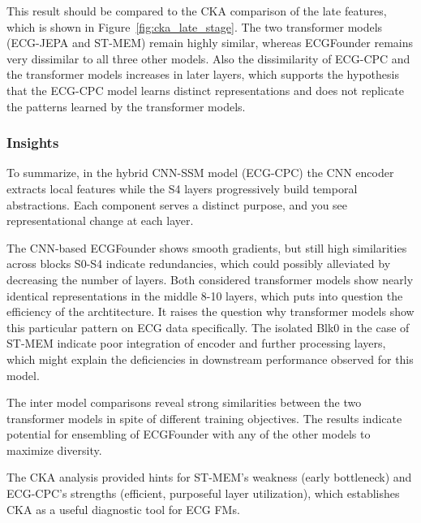 \documentclass{article}
\begin{document}
            This result should be compared to the CKA comparison of the late features, which is shown in Figure~\ref{fig:cka_late_stage}. The two transformer models (ECG-JEPA and ST-MEM) remain highly similar, whereas ECGFounder remains very dissimilar to all three other models. Also the dissimilarity of ECG-CPC and the transformer models increases in later layers, which supports the hypothesis that the ECG-CPC model learns distinct representations and does not replicate the patterns learned by the transformer models.


            \subsubsection{Insights} To summarize, in the hybrid CNN-SSM model (ECG-CPC) the CNN encoder extracts local features while the S4 layers progressively build temporal abstractions. Each component serves a distinct purpose, and you see representational change at each layer.
            
            The CNN-based ECGFounder shows smooth gradients, but still high similarities across blocks S0-S4 indicate redundancies, which could possibly alleviated by decreasing the number of layers. Both considered transformer models show nearly identical representations in the middle 8-10 layers, which puts into question the efficiency of the archtitecture. It raises the question why transformer models show this particular pattern on ECG data specifically. The isolated Blk0 in the case of ST-MEM indicate poor integration of encoder and further processing layers, which might explain the deficiencies in downstream performance observed for this model.

            The inter model comparisons reveal strong similarities between the two transformer models in spite of different training objectives. The results indicate potential for ensembling of ECGFounder with any of the other models to maximize diversity.

            The CKA analysis provided hints for ST-MEM's weakness (early bottleneck) and ECG-CPC's strengths (efficient, purposeful layer utilization), which establishes CKA as a useful diagnostic tool for ECG FMs.
\end{document}
